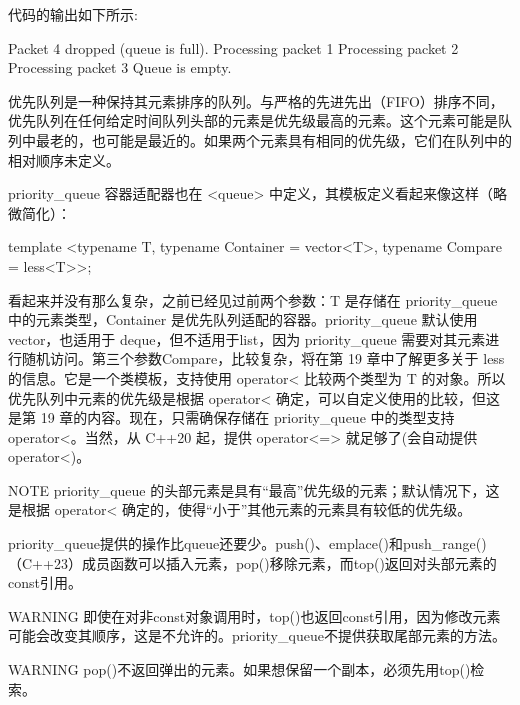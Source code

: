 代码的输出如下所示:

\begin{shell}
Packet 4 dropped (queue is full).
Processing packet 1
Processing packet 2
Processing packet 3
Queue is empty.
\end{shell}


优先队列是一种保持其元素排序的队列。与严格的先进先出（FIFO）排序不同，优先队列在任何给定时间队列头部的元素是优先级最高的元素。这个元素可能是队列中最老的，也可能是最近的。如果两个元素具有相同的优先级，它们在队列中的相对顺序未定义。

priority\_queue 容器适配器也在 <queue> 中定义，其模板定义看起来像这样（略微简化）：

\begin{cpp}
template <typename T, typename Container = vector<T>,
          typename Compare = less<T>>;
\end{cpp}

看起来并没有那么复杂，之前已经见过前两个参数：T 是存储在 priority\_queue 中的元素类型，Container 是优先队列适配的容器。priority\_queue 默认使用 vector，也适用于 deque，但不适用于list，因为 priority\_queue 需要对其元素进行随机访问。第三个参数Compare，比较复杂，将在第 19 章中了解更多关于 less 的信息。它是一个类模板，支持使用 operator< 比较两个类型为 T 的对象。所以优先队列中元素的优先级是根据 operator< 确定，可以自定义使用的比较，但这是第 19 章的内容。现在，只需确保存储在 priority\_queue 中的类型支持 operator<。当然，从 C++20 起，提供 operator<=> 就足够了(会自动提供 operator<)。

\begin{myNotic}{NOTE}
priority\_queue 的头部元素是具有“最高”优先级的元素；默认情况下，这是根据 operator< 确定的，使得“小于”其他元素的元素具有较低的优先级。
\end{myNotic}


priority\_queue提供的操作比queue还要少。push()、emplace()和push\_range()（C++23）成员函数可以插入元素，pop()移除元素，而top()返回对头部元素的const引用。

\begin{myWarning}{WARNING}
即使在对非const对象调用时，top()也返回const引用，因为修改元素可能会改变其顺序，这是不允许的。priority\_queue不提供获取尾部元素的方法。
\end{myWarning}

\begin{myWarning}{WARNING}
pop()不返回弹出的元素。如果想保留一个副本，必须先用top()检索。
\end{myWarning}

